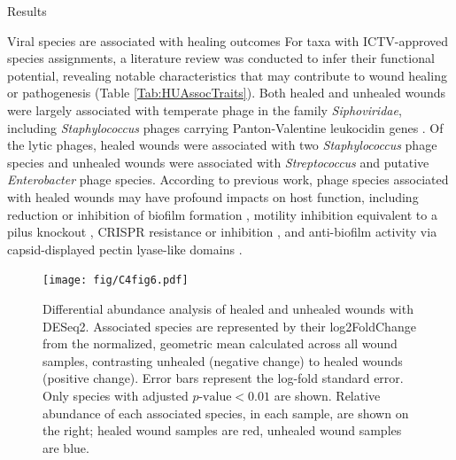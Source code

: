 \documentclass[oneside,12pt,final]{sty/ucthesis-CA2012}
\begin{document}
\begin{mainmatter}
\begin{section}{Results}
\begin{subsection}{Viral species are associated with healing outcomes}
For taxa with ICTV-approved species assignments, a literature review was conducted to infer their functional potential, revealing notable characteristics that may contribute to wound healing or pathogenesis (Table \ref{Tab:HUAssocTraits}). Both healed and unhealed wounds were largely associated with temperate phage in the family \textit{Siphoviridae}, including \textit{Staphylococcus} phages carrying Panton-Valentine leukocidin genes \cite{RN183, RN192}. Of the lytic phages, healed wounds were associated with two \textit{Staphylococcus} phage species and unhealed wounds were associated with \textit{Streptococcus} and putative \textit{Enterobacter} phage species. According to previous work, phage species associated with healed wounds may have profound impacts on host function, including reduction or inhibition of biofilm formation \cite{RN178, RN180}, motility inhibition equivalent to a pilus knockout \cite{RN178}, CRISPR resistance or inhibition \cite{RN179, RN180}, and anti-biofilm activity via capsid-displayed pectin lyase-like domains \cite{RN186}. 

\begin{figure}
\centering
\centerline{\texttt{[image: fig/C4fig6.pdf]}}
\caption{Differential abundance analysis of healed and unhealed wounds with DESeq2. Associated species are represented by their log2FoldChange from the normalized, geometric mean calculated across all wound samples, contrasting unhealed (negative change) to healed wounds (positive change). Error bars represent the log-fold standard error. Only species with adjusted $p\text{-value}<0.01$ are shown. Relative abundance of each associated species, in each sample, are shown on the right; healed wound samples are red, unhealed wound samples are blue.}
\label{fig:C4F6}
\end{figure}


\end{subsection}
\end{section}
\end{mainmatter}
\end{document}
